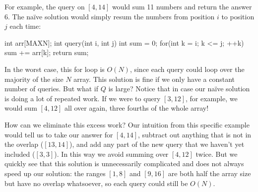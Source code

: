 \begin{center}
{
}
\end{center}

For example, the query on $[4,14]$ would sum 11 numbers and return the answer 6.
The na\"{i}ve solution would simply resum the numbers from position $i$ to position $j$ each time:

\begin{mylstlisting}
int arr[MAXN];
int query(int i, int j) {
	int sum = 0;
	for(int k = i; k <= j; ++k)
		sum += arr[k];
	return sum;
}
\end{mylstlisting}

In the worst case, this for loop is $O(N)$, since each query could loop over the majority of the size $N$ array.
This solution is fine if we only have a constant number of queries. But what if $Q$ is large? Notice that in case our na\"{i}ve solution is doing a lot of repeated work.
If we were to query $[3,12]$, for example, we would sum $[4,12]$ all over again, three fourths of the whole array! 

How can we eliminate this excess work? Our intuition from this specific example
would tell us to take our answer for $[4,14]$, subtract out anything that is not in the overlap ($[13,14]$),
and add any part of the new query that we haven't yet included ($[3,3]$). In this way we avoid summing over $[4,12]$ twice. But we quickly see that this solution is 
unnecessarily complicated and does not always speed up our solution: the ranges $[1,8]$ and $[9,16]$ are both half the array size but have no overlap whatsoever, so each
query could still be $O(N)$.

